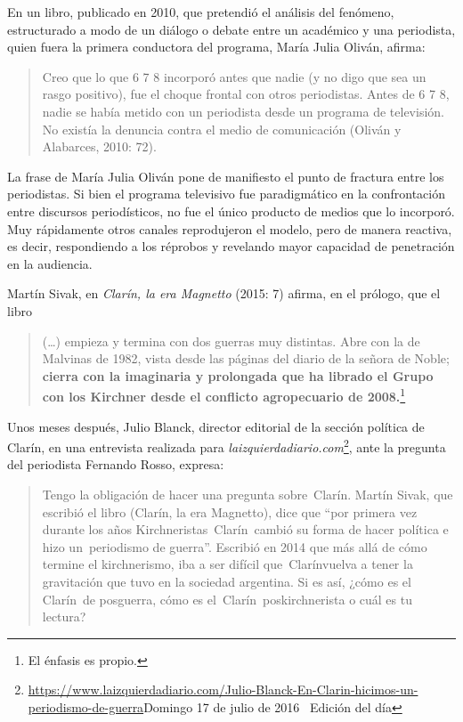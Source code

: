 {En un libro, publicado en 2010, que pretendió el análisis del fenómeno, estructurado a modo de un diálogo o debate entre un académico y una periodista, quien fuera la primera conductora del programa, María Julia Oliván, afirma:

\begin{quote}
Creo que lo que 6 7 8 incorporó antes que nadie (y no digo que sea un rasgo positivo), fue el choque frontal con otros periodistas. Antes de 6 7 8, nadie se había metido con un periodista desde un programa de televisión. No existía la denuncia contra el medio de comunicación (Oliván y Alabarces, 2010: 72).
\end{quote}

La frase de María Julia Oliván pone de manifiesto el punto de fractura entre los periodistas. Si bien el programa televisivo fue paradigmático en la confrontación entre discursos periodísticos, no fue el único producto de medios que lo incorporó. Muy rápidamente otros canales reprodujeron el modelo, pero de manera reactiva, es decir, respondiendo a los réprobos y revelando mayor capacidad de penetración en la audiencia.

Martín Sivak, en \emph{Clarín, la era Magnetto} (2015: 7) afirma, en el prólogo, que el libro

\begin{quote}
(\ldots) empieza y termina con dos guerras muy distintas. Abre con la de Malvinas de 1982, vista desde las páginas del diario de la señora de Noble; \textbf{cierra con la imaginaria y prolongada que ha librado el Grupo con los Kirchner desde el conflicto agropecuario de 2008.}\footnote{El énfasis es propio.}
\end{quote}

Unos meses después, Julio Blanck, director editorial de la sección política de Clarín, en una entrevista realizada para \emph{laizquierdadiario.com}\footnote{\url{https://www.laizquierdadiario.com/Julio-Blanck-En-Clarin-hicimos-un-periodismo-de-guerra}Domingo 17 de julio de 2016~\textbar{} Edición del día}, ante la pregunta del periodista Fernando Rosso, expresa:

\begin{quote}
Tengo la obligación de hacer una pregunta sobre~Clarín. Martín Sivak, que escribió el libro (Clarín, la era Magnetto), dice que \enquote{por primera vez durante los años Kirchneristas~Clarín~cambió su forma de hacer política e hizo un~periodismo de guerra}. Escribió en 2014 que más allá de cómo termine el kirchnerismo, iba a ser difícil que~Clarínvuelva  a tener la gravitación que tuvo en la sociedad argentina. Si es así, ¿cómo es el Clarín~de posguerra, cómo es el~Clarín~poskirchnerista o cuál es tu lectura?
\end{quote}

}
